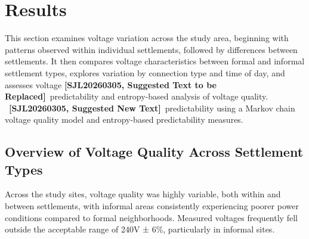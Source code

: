\documentclass[review]{elsarticle}
\DeclareRobustCommand{\suggestreplacesjl}[2]{%
  {\color{sjlmutedred}\textbf{[SJL20260305, Suggested Text to be Replaced]}\ #1}%
  \ {\color{sjlmutedblue}\textbf{[SJL20260305, Suggested New Text]}\ #2}%
}
\begin{document}

\section{Results}
This section examines voltage variation across the study area, beginning with patterns observed within individual settlements, followed by differences between settlements. It then compares voltage characteristics between formal and informal settlement types, explores variation by connection type and time of day, and assesses voltage \suggestreplacesjl{predictability and entropy-based analysis of voltage quality.}{predictability using a Markov chain voltage quality model and entropy-based predictability measures.}

\label{sec:results}
\subsection{Overview of Voltage Quality Across Settlement Types}
Across the study sites, voltage quality was highly variable, both within and between settlements, with informal areas consistently experiencing poorer power conditions compared to formal neighborhoods. Measured voltages frequently fell outside the acceptable range of 240V ± 6\%, particularly in informal sites.
\end{document}
